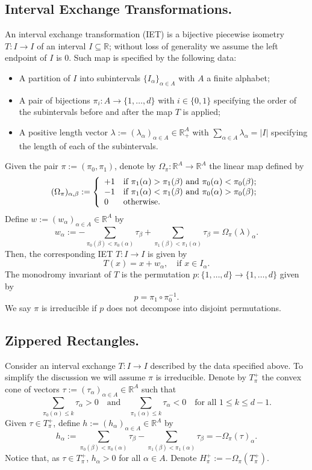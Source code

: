 \documentclass{amsart}
\theoremstyle{definition}
\theoremstyle{remark}
\numberwithin{equation}{section}
\newcommand{\<}{{\langle}}
\renewcommand{\>}{{\rangle}}
\newcommand{\field}[1]{\mathbb{#1}}
\newcommand{\R}{\field{R}}
\begin{document}
\subsection{Interval Exchange Transformations.} An interval exchange transformation (IET) is a bijective piecewise isometry $T \colon I \to I$ of an interval $I \subseteq \mathbb{R}$; without loss of generality we assume the left endpoint of $I$ is $0$. Such map is specified by the following data:
\begin{itemize}
    \item A partition of $I$ into subintervals $\{I_\alpha\}_{\alpha \in A}$ with $A$ a finite alphabet;
    \item A pair of bijections $\pi_i \colon A \to \{1,\dots,d\}$ with $i \in \{0,1\}$ specifying the order of the subintervals before and after the map $T$ is applied;
    \item A positive length vector $\lambda := (\lambda_\alpha)_{\alpha \in A} \in \mathbb{R}_+^A$ with $\sum_{\alpha \in A} \lambda_\alpha = |I|$ specifying the length of each of the subintervals.
\end{itemize}
Given the pair $\pi := (\pi_0,\pi_1)$, denote by $\Omega_\pi \colon \mathbb{R}^A \to \R^A$ the linear map defined by
\[
(\Omega_\pi)_{\alpha,\beta} := \left\lbrace \begin{array}{l l}
     +1& \text{if $\pi_1(\alpha) > \pi_1(\beta)$ and $\pi_0(\alpha)< \pi_0(\beta)$;} \\
     -1& \text{if $\pi_1(\alpha) < \pi_1(\beta)$ and $\pi_0(\alpha)> \pi_0(\beta)$;} \\
     0 & \text{otherwise.}
\end{array} \right.
\]
Define $w := (w_\alpha)_{\alpha \in A} \in \R^A$ by
\[
w_\alpha := -\sum_{\pi_0(\beta) < \pi_0(\alpha)} \tau_\beta + \sum_{\pi_1(\beta) < \pi_1(\alpha)} \tau_\beta = \Omega_\pi(\lambda)_\alpha.
\]
Then, the corresponding IET $T \colon I \to I$ is given by
\[
T(x) = x + w_\alpha, \quad \text{if } x \in I_\alpha.
\]
The monodromy invariant of $T$ is the permutation $p \colon \{1, \dots, d \} \to \{1,\dots,d\}$ given by
\[
p = \pi_1 \circ \pi_0^{-1}.
\]
We say $\pi$ is irreducible if $p$ does not decompose into disjoint permutations.

\subsection{Zippered Rectangles.} Consider an interval exchange $T \colon I \to I$ described by the data specified above. To simplify the discussion we will assume $\pi$ is irreducible. Denote by $T_\pi^+$ the convex cone of vectors $\tau := (\tau_\alpha)_{\alpha \in A} \in \R^A$ such that
\[
\sum_{\pi_0(\alpha) \leq k} \tau_\alpha > 0 \quad \text{and} \quad \sum_{\pi_1(\alpha) \leq k} \tau_\alpha < 0 \quad \text{for all } 1 \leq k \leq d-1.
\]
Given $\tau \in T_\pi^+$, define $h := (h_\alpha)_{\alpha \in A} \in \R^A$ by
\[
h_\alpha := \sum_{\pi_0(\beta) < \pi_0(\alpha)} \tau_\beta - \sum_{\pi_1(\beta) < \pi_1(\alpha)} \tau_\beta = -\Omega_\pi(\tau)_\alpha.
\]
Notice that, as $\tau \in T_\pi^+$, $h_\alpha > 0$ for all $\alpha \in A$. Denote $H_\pi^+ := -\Omega_\pi(T_\pi^+).$
\end{document}
